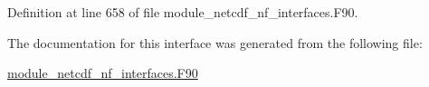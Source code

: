 Definition at line 658 of file module\+\_\+netcdf\+\_\+nf\+\_\+interfaces.\+F90.



The documentation for this interface was generated from the following file\+:\begin{DoxyCompactItemize}
\item 
\hyperlink{module__netcdf__nf__interfaces_8F90}{module\+\_\+netcdf\+\_\+nf\+\_\+interfaces.\+F90}\end{DoxyCompactItemize}
